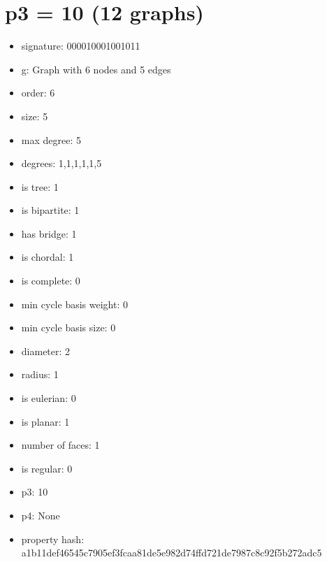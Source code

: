 \chapter{p3 = 10 (12 graphs)}
\newpage\begin{figure}
\end{figure}
\begin{itemize}
\item signature: 000010001001011
\item g: Graph with 6 nodes and 5 edges
\item order: 6
\item size: 5
\item max degree: 5
\item degrees: 1,1,1,1,1,5
\item is tree: 1
\item is bipartite: 1
\item has bridge: 1
\item is chordal: 1
\item is complete: 0
\item min cycle basis weight: 0
\item min cycle basis size: 0
\item diameter: 2
\item radius: 1
\item is eulerian: 0
\item is planar: 1
\item number of faces: 1
\item is regular: 0
\item p3: 10
\item p4: None
\item property hash: a1b11def46545c7905ef3fcaa81de5e982d74ffd721de7987c8c92f5b272adc5
\end{itemize}
\newpage
\begin{figure}
\end{figure}
